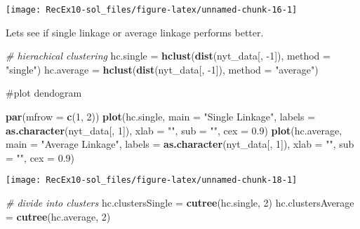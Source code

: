 \documentclass[]{article}
\newenvironment{Shaded}{\begin{snugshade}}{\end{snugshade}}
\newcommand{\CommentTok}[1]{\textcolor[rgb]{0.56,0.35,0.01}{\textit{#1}}}
\newcommand{\DataTypeTok}[1]{\textcolor[rgb]{0.13,0.29,0.53}{#1}}
\newcommand{\DecValTok}[1]{\textcolor[rgb]{0.00,0.00,0.81}{#1}}
\newcommand{\FloatTok}[1]{\textcolor[rgb]{0.00,0.00,0.81}{#1}}
\newcommand{\KeywordTok}[1]{\textcolor[rgb]{0.13,0.29,0.53}{\textbf{#1}}}
\newcommand{\NormalTok}[1]{#1}
\newcommand{\StringTok}[1]{\textcolor[rgb]{0.31,0.60,0.02}{#1}}
\begin{document}
\begin{center}\texttt{[image: RecEx10-sol\_files/figure-latex/unnamed-chunk-16-1]} \end{center}

Lets see if single linkage or average linkage performs better.

\begin{Shaded}
\begin{Highlighting}[]
\CommentTok{# hierachical clustering}
\NormalTok{hc.single =}\StringTok{ }\KeywordTok{hclust}\NormalTok{(}\KeywordTok{dist}\NormalTok{(nyt_data[, }\DecValTok{-1}\NormalTok{]), }\DataTypeTok{method =} \StringTok{"single"}\NormalTok{)}
\NormalTok{hc.average =}\StringTok{ }\KeywordTok{hclust}\NormalTok{(}\KeywordTok{dist}\NormalTok{(nyt_data[, }\DecValTok{-1}\NormalTok{]), }\DataTypeTok{method =} \StringTok{"average"}\NormalTok{)}
\end{Highlighting}
\end{Shaded}

\#plot dendogram

\begin{Shaded}
\begin{Highlighting}[]
\KeywordTok{par}\NormalTok{(}\DataTypeTok{mfrow =} \KeywordTok{c}\NormalTok{(}\DecValTok{1}\NormalTok{, }\DecValTok{2}\NormalTok{))}
\KeywordTok{plot}\NormalTok{(hc.single, }\DataTypeTok{main =} \StringTok{"Single Linkage"}\NormalTok{, }\DataTypeTok{labels =} \KeywordTok{as.character}\NormalTok{(nyt_data[, }\DecValTok{1}\NormalTok{]), }
    \DataTypeTok{xlab =} \StringTok{""}\NormalTok{, }\DataTypeTok{sub =} \StringTok{""}\NormalTok{, }\DataTypeTok{cex =} \FloatTok{0.9}\NormalTok{)}
\KeywordTok{plot}\NormalTok{(hc.average, }\DataTypeTok{main =} \StringTok{"Average Linkage"}\NormalTok{, }\DataTypeTok{labels =} \KeywordTok{as.character}\NormalTok{(nyt_data[, }
    \DecValTok{1}\NormalTok{]), }\DataTypeTok{xlab =} \StringTok{""}\NormalTok{, }\DataTypeTok{sub =} \StringTok{""}\NormalTok{, }\DataTypeTok{cex =} \FloatTok{0.9}\NormalTok{)}
\end{Highlighting}
\end{Shaded}

\begin{center}\texttt{[image: RecEx10-sol\_files/figure-latex/unnamed-chunk-18-1]} \end{center}

\begin{Shaded}
\begin{Highlighting}[]
\CommentTok{# divide into clusters}
\NormalTok{hc.clustersSingle =}\StringTok{ }\KeywordTok{cutree}\NormalTok{(hc.single, }\DecValTok{2}\NormalTok{)}
\NormalTok{hc.clustersAverage =}\StringTok{ }\KeywordTok{cutree}\NormalTok{(hc.average, }\DecValTok{2}\NormalTok{)}
\end{Highlighting}
\end{Shaded}
\end{document}
